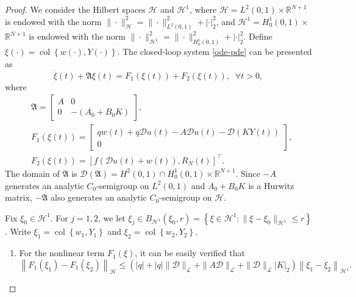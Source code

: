 \documentclass[review]{elsarticle}
\numberwithin{equation}{section}
\begin{document}
\begin{proof}
   We consider the Hilbert spaces $\mathcal{H}$ and $\mathcal{H}^1$, where $\mathcal{H}=L^2(0,1) \times \mathbb{R}^{N+1}$ is endowed with the norm $\|\cdot\|_{\mathcal{H}}^2=\|\cdot\|_{L^2(0,1)}^2+|\cdot|_2^2$, and $\mathcal{H}^1=H^1_0(0,1) \times$ $\mathbb{R}^{N+1}$ is endowed with the norm $\|\cdot\|_{\mathcal{H}^1}^2=\|\cdot\|_{H^1_0(0,1)}^2+|\cdot|_2^2$. Define $\xi(\cdot)=\operatorname{col}\left\{w(\cdot), Y(\cdot)\right\}$. The closed-loop system \eqref{ode-pde} can be presented as
\begin{equation}
    \label{wellpose}
\dot{\xi}(t)+\mathfrak{A}  \xi(t)=F_1(\xi(t))+F_2(\xi(t)),\;\; \forall t>0,
\end{equation}
where
$$
\begin{aligned}
& \mathfrak{A} =\left[\begin{array}{cc}
A & 0 \\
0 & -(A_0+B_0K)
\end{array}\right], \\
& F_1(\xi(t))=\left[\begin{array}{c}
q w(t)+q\mathcal{D} u(t)-A \mathcal{D} u(t)-\mathcal{D} (KY(t)) \\
0
\end{array}\right], \\
& F_2(\xi(t))=\left[f\left(\mathcal{D}u(t)+w(t)\right), R_N(t)\right]^{\top}.
\end{aligned}
$$
The domain of $\mathfrak{A} $ is $\mathcal{D}(\mathfrak{A})=H^2(0,1)\cap H^1_0(0,1) \times \mathbb{R}^{N+1}$. Since $-A$ generates an analytic $C_0$-semigroup on $L^2(0,1)$ and $A_0+B_0K$ is a Hurwitz matrix, $-\mathfrak{A} $ also generates an analytic $C_0$-semigroup on $\mathcal{H}$. 

Fix $\xi_0 \in \mathcal{H}^1$. For $j=1,2$, we let $\xi_j \in B_{{\mathcal{H}^1}}\left(\xi_0, r\right)=\left\{\xi\in \mathcal{H}^1: \|\xi-{\xi}_0\|_{\mathcal{H}^1}\le r\right\}$. Write $\xi_1=\operatorname{col}\left\{w_1, Y_1\right\} $ and $ \xi_2=\operatorname{col}\left\{w_2, Y_2\right\}$. 

\begin{enumerate}
    \item[(i)] For the nonlinear term $F_1(\xi)$, it can be easily verified that
\begin{equation*}
\left\|F_1\left(\xi_1\right)-F_1\left(\xi_2\right)\right\|_{\mathcal{H}} \leq\left(|q|+|q|\|\mathcal{D}\|_{\mathcal{L}}+\|A\mathcal{D}\|_{\mathcal{L}}+\|\mathcal{D}\|_{\mathcal{L}}|K|_2\right)\left\|\xi_1-\xi_2\right\|_{\mathcal{H}^1}.
\end{equation*}


\end{enumerate}
\end{proof}
\end{document}
